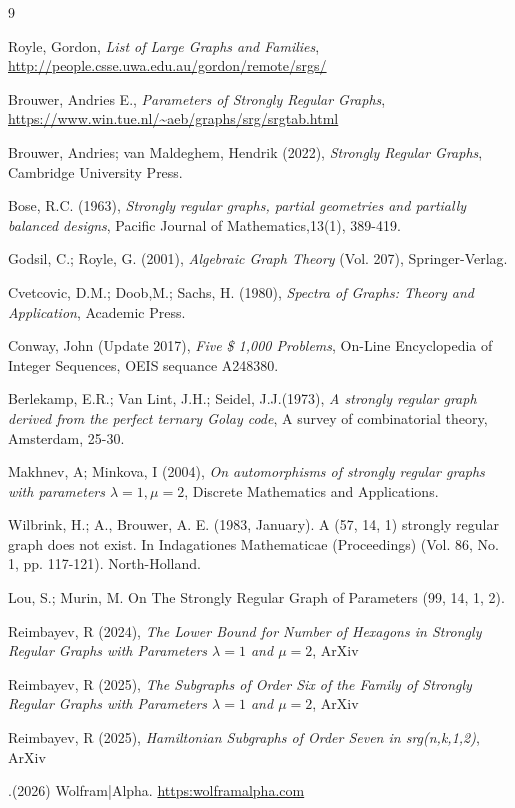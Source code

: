 \documentclass[12pt]{article} %
\begin{document}
\begin{thebibliography}{9}

Royle, Gordon, \emph{List of Large Graphs and Families},
\url{http://people.csse.uwa.edu.au/gordon/remote/srgs/}

Brouwer, Andries E., \emph{Parameters of Strongly Regular Graphs},
\url{https://www.win.tue.nl/~aeb/graphs/srg/srgtab.html}

Brouwer, Andries; van Maldeghem, Hendrik (2022), \emph{Strongly Regular Graphs}, Cambridge University Press.

Bose, R.C. (1963), \emph{Strongly regular graphs, partial geometries and partially balanced designs}, Pacific Journal of Mathematics,13(1), 389-419.

Godsil, C.; Royle, G. (2001), \emph{Algebraic Graph Theory} (Vol. 207), Springer-Verlag.

Cvetcovic, D.M.; Doob,M.; Sachs, H. (1980), \emph{Spectra of Graphs: Theory and Application}, Academic Press.

Conway, John (Update 2017), \emph{Five \$ 1,000 Problems}, On-Line Encyclopedia of Integer Sequences, OEIS sequance A248380.

Berlekamp, E.R.; Van Lint, J.H.; Seidel, J.J.(1973), \emph{A strongly regular graph derived from the perfect ternary Golay code}, A survey of combinatorial theory, Amsterdam, 25-30.

Makhnev, A; Minkova, I (2004), \emph{On automorphisms of strongly regular graphs with parameters $\lambda =1, \mu = 2$}, Discrete Mathematics and Applications.

Wilbrink, H.; A., Brouwer, A. E. (1983, January). A (57, 14, 1) strongly regular graph does not exist. In Indagationes Mathematicae (Proceedings) (Vol. 86, No. 1, pp. 117-121). North-Holland.

Lou, S.; Murin, M. On The Strongly Regular Graph of Parameters (99, 14, 1, 2).

Reimbayev, R (2024), \emph{The Lower Bound for Number of Hexagons in Strongly Regular Graphs with Parameters $\lambda=1$ and $\mu=2$}, ArXiv

Reimbayev, R (2025), \emph{The Subgraphs of Order Six of the Family of Strongly Regular Graphs with Parameters $\lambda=1$ and $\mu=2$}, ArXiv

Reimbayev, R (2025), \emph{Hamiltonian Subgraphs of Order Seven in srg(n,k,1,2)}, ArXiv

.(2026) Wolfram|Alpha. \url{https:wolframalpha.com}
\end{thebibliography}


\end{document}
